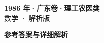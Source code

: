 \documentclass[zihao=-4, a4paper]{ctexart}
\begin{document}
\begin{center}
  {\Large\bfseries 1986 年·广东卷·理工农医类}\\[4pt]
  {\large 数学 · 解析版}
\end{center}
\medskip
{}

\clearpage
{}
\begin{center}{\Large\bfseries 参考答案与详细解析}\end{center}
\medskip

\end{document}
